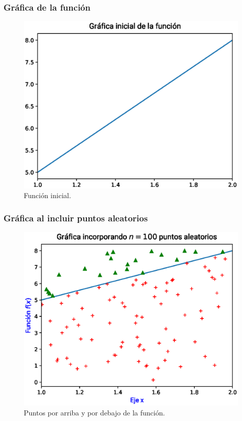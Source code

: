 \begin{frame}
\frametitle{Gráfica de la función}
\begin{figure}
	\centering
	\includegraphics[scale=0.55]{Imagenes/area_puntos_01.eps}
    \caption{Función inicial.}
\end{figure}
\end{frame}
\begin{frame}
\frametitle{Gráfica al incluir puntos aleatorios}
\begin{figure}
    \centering
    \includegraphics[scale=0.55]{Imagenes/area_puntos_02.eps}
    \caption{Puntos por arriba y por debajo de la función.}
\end{figure}
\end{frame}
